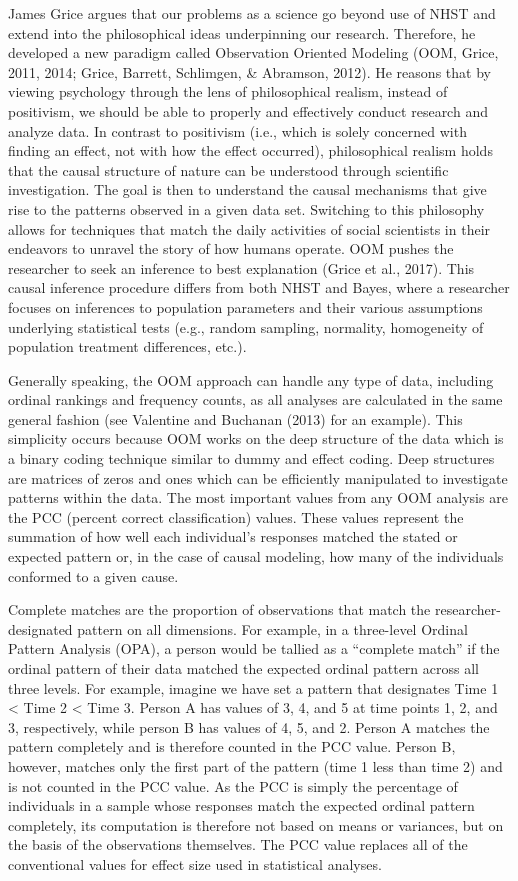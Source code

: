 \documentclass[,man, mask]{apa6}
\begin{document}
James Grice argues that our problems as a science go beyond use of NHST and extend into the philosophical ideas underpinning our research. Therefore, he developed a new paradigm called Observation Oriented Modeling (OOM, Grice, 2011, 2014; Grice, Barrett, Schlimgen, \& Abramson, 2012). He reasons that by viewing psychology through the lens of philosophical realism, instead of positivism, we should be able to properly and effectively conduct research and analyze data. In contrast to positivism (i.e., which is solely concerned with finding an effect, not with how the effect occurred), philosophical realism holds that the causal structure of nature can be understood through scientific investigation. The goal is then to understand the causal mechanisms that give rise to the patterns observed in a given data set. Switching to this philosophy allows for techniques that match the daily activities of social scientists in their endeavors to unravel the story of how humans operate. OOM pushes the researcher to seek an inference to best explanation (Grice et al., 2017). This causal inference procedure differs from both NHST and Bayes, where a researcher focuses on inferences to population parameters and their various assumptions underlying statistical tests (e.g., random sampling, normality, homogeneity of population treatment differences, etc.).

Generally speaking, the OOM approach can handle any type of data, including ordinal rankings and frequency counts, as all analyses are calculated in the same general fashion (see Valentine and Buchanan (2013) for an example). This simplicity occurs because OOM works on the deep structure of the data which is a binary coding technique similar to dummy and effect coding. Deep structures are matrices of zeros and ones which can be efficiently manipulated to investigate patterns within the data. The most important values from any OOM analysis are the PCC (percent correct classification) values. These values represent the summation of how well each individual's responses matched the stated or expected pattern or, in the case of causal modeling, how many of the individuals conformed to a given cause.

Complete matches are the proportion of observations that match the researcher-designated pattern on all dimensions. For example, in a three-level Ordinal Pattern Analysis (OPA), a person would be tallied as a \enquote{complete match} if the ordinal pattern of their data matched the expected ordinal pattern across all three levels. For example, imagine we have set a pattern that designates Time 1 \textless{} Time 2 \textless{} Time 3. Person A has values of 3, 4, and 5 at time points 1, 2, and 3, respectively, while person B has values of 4, 5, and 2. Person A matches the pattern completely and is therefore counted in the PCC value. Person B, however, matches only the first part of the pattern (time 1 less than time 2) and is not counted in the PCC value. As the PCC is simply the percentage of individuals in a sample whose responses match the expected ordinal pattern completely, its computation is therefore not based on means or variances, but on the basis of the observations themselves. The PCC value replaces all of the conventional values for effect size used in statistical analyses.
\end{document}
